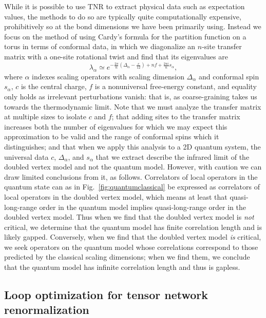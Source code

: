 \documentclass[aps,prb,letterpaper,superscriptaddress,twocolumn,showpacs,floatfix,10pt]{revtex4-1}
\begin{document}
While it is possible to use TNR to extract physical data such as expectation
values, the methods to do so are typically quite computationally expensive,
prohibitively so at the bond dimensions we have been primarily using.
Instead we focus on the method \cite{TNRHauru} of using Cardy's
formula for the
partition function on a torus in terms of conformal data\cite{Cardyoperator},
in which we diagonalize an $n$-site transfer matrix with a one-site rotational
twist and find that its eigenvalues are
\begin{equation}
\lambda_\alpha \simeq e^{-\frac{2\pi}{n}(\Delta_\alpha - \frac{c}{12})+nf+\frac{2\pi i}{n}s_\alpha},
\end{equation}
where $\alpha$ indexes scaling operators with scaling dimension $\Delta_\alpha$
and conformal spin $s_\alpha$, $c$ is the central charge,
$f$ is a nonuniversal free-energy constant, and equality only holds as
irrelevant perturbations vanish: that is, as coarse-graining takes us
towards the thermodynamic limit. Note that we must analyze the transfer matrix
at multiple sizes to isolate $c$ and $f$; that adding sites to the transfer
matrix increases both the number of eigenvalues for which we may expect this
approximation to be valid and the range of conformal spins which it
distinguishes; and that when we apply this analysis to a 2D quantum system,
the universal data $c$, $\Delta_\alpha$, and $s_\alpha$ that we extract
describe the infrared limit of the doubled vertex model and not
the quantum model. However, with caution we can draw limited
conclusions from it, as follows. Correlators of local
operators in the quantum state can as in Fig.~\ref{fig:quantumclassical}
be expressed as correlators of local operators in the doubled vertex model,
which means at least that quasi-long-range order in
the quantum model implies quasi-long-range order in
the doubled vertex model. Thus when we find that the doubled vertex model is
\textit{not} critical, we determine that the quantum model has finite
correlation length and is likely gapped. Conversely, when we find that the
doubled vertex model \textit{is} critical, we seek operators on the quantum
model whose correlations
correspond to those predicted by the classical scaling dimensions; when we
find them, we conclude that the quantum model has infinite correlation length
and thus is gapless.\cite{Hastings1,Hastings2}
\subsection{Loop optimization for tensor network renormalization}
\end{document}
